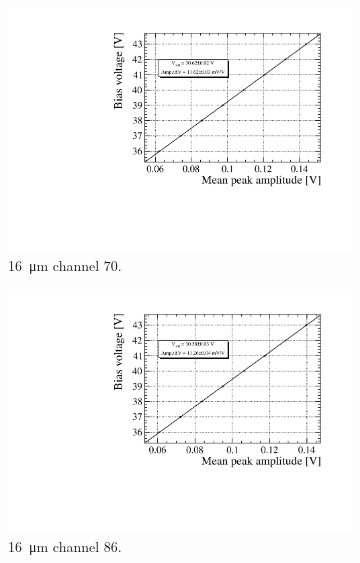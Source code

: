 \begin{figure}[htbp]
  \centering
  \begin{subfigure}{0.48\textwidth}
    \includegraphics[width=1\linewidth]{gfx/plots/WA/16/Breakdown_voltage70.pdf}
    \caption{\SI{16}{\micro m} channel $70$.}  
  \end{subfigure}
  \hfill
  \begin{subfigure}{0.48\textwidth}
    \includegraphics[width=1\linewidth]{gfx/plots/WA/16/Breakdown_voltage86.pdf}
    \caption{\SI{16}{\micro m} channel $86$.}   
  \end{subfigure}
  \hfill
  \begin{subfigure}{0.48\textwidth}

\end{subfigure}
\end{figure}
